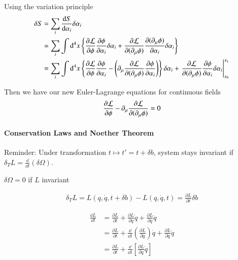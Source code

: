 Using the variation principle
\begin{align*}
   \delta S &= \sum_i \frac{\dd{S}}{\dd{\alpha_i}} \delta \alpha_i \\
            &= \sum_i \int \dd[4]{x} \left\{ \frac{\partial \lag}{\partial \phi} \frac{\partial \phi}{\partial \alpha_i} \delta \alpha_i + \frac{\partial \lag}{\partial (\partial_\mu \phi)} \frac{\partial (\partial_\mu \phi)}{\partial \alpha_i} \delta \alpha_i \right\} \\
            &= \sum_i \int \dd[4]{x} \left\{ \frac{\partial \lag}{\partial \phi} \frac{\partial \phi}{\partial \alpha_i} - \left( \partial_\mu \frac{\partial \lag}{\partial (\partial_\mu \phi)} \frac{\partial \phi}{\partial \alpha_i} \right) \right\}\delta \alpha_i + \eval{\frac{\partial \lag}{\partial (\partial_\mu \phi)} \frac{\partial \phi}{\partial \alpha_i} \delta\alpha_i}_{x_0}^{x_1}
\end{align*}

Then we have our new Euler-Lagrange equations for continuous fields
\begin{align}
   \frac{\partial \mathcal{L}}{\partial \phi} - \partial_\mu \frac{\partial \mathcal{L}}{\partial(\partial_\mu \phi)} = 0
\end{align}

\paragraph{Conservation Laws and Noether Theorem}
Reminder: Under transformation $t \mapsto t' = t + \delta b$, system stays invariant if $\delta_T L = \frac{\dd}{\dd{t}}(\delta \Omega)$.

$\delta \Omega = 0$ if $L$ invariant

\begin{align*}
   \delta_T L = L(q, \dot{q}, t+\delta b) - L (q, \dot{q}, t) = \frac{\partial L}{\partial t} \delta b
\end{align*}

\begin{align*}
   \frac{\dd{L}}{\dd{t}} &= \frac{\partial L}{\partial t} + \frac{\partial L}{\partial q} \dot{q} + \frac{\partial L}{\partial \dot{q}} \ddot{q} \\
                         &= \frac{\partial L}{\partial t} + \frac{\dd}{\dd{t}} \left (\frac{\partial L}{\partial \dot{q}} \right) \dot{q} + \frac{\partial L}{\partial \dot{q}} \ddot{q} \\
                         &= \frac{\partial L}{\partial t} + \frac{\dd}{\dd{t}} \left[ \frac{\partial L}{\partial \dot{q}} \dot{q} \right] \\
\end{align*}

